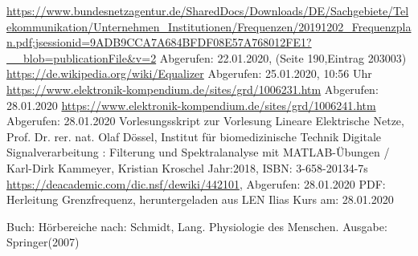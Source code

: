\begin{thebibliography}{99}

 \url{https://www.bundesnetzagentur.de/SharedDocs/Downloads/DE/Sachgebiete/Telekommunikation/Unternehmen_Institutionen/Frequenzen/20191202_Frequenzplan.pdf;jsessionid=9ADB9CCA7A684BFDF08E57A768012FE1?__blob=publicationFile&v=2} Abgerufen: 22.01.2020, (Seite 190,Eintrag 203003)
 \url{https://de.wikipedia.org/wiki/Equalizer} Abgerufen: 25.01.2020, 10:56 Uhr
 \url{https://www.elektronik-kompendium.de/sites/grd/1006231.htm}
Abgerufen: 28.01.2020
 \url{https://www.elektronik-kompendium.de/sites/grd/1006241.htm} Abgerufen: 28.01.2020
 Vorlesungsskript zur Vorlesung Lineare Elektrische Netze, Prof. Dr. rer. nat. Olaf Dössel, Institut für biomedizinische Technik
 Digitale Signalverarbeitung : Filterung und Spektralanalyse mit MATLAB-Übungen / Karl-Dirk Kammeyer, Kristian Kroschel Jahr:2018, ISBN: 3-658-20134-7s
 \url{https://deacademic.com/dic.nsf/dewiki/442101}, Abgerufen: 28.01.2020
 PDF: Herleitung Grenzfrequenz, heruntergeladen aus LEN Ilias Kurs am: 28.01.2020

 Buch: Hörbereiche nach: Schmidt, Lang. Physiologie des Menschen. Ausgabe: Springer(2007)






\end{thebibliography}
